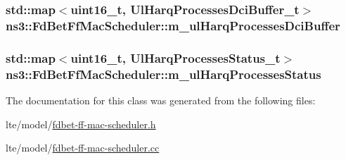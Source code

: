 \subsubsection[{\texorpdfstring{m\+\_\+ul\+Harq\+Processes\+Dci\+Buffer}{m_ulHarqProcessesDciBuffer}}]{\setlength{\rightskip}{0pt plus 5cm}std\+::map$<$uint16\+\_\+t, {\bf Ul\+Harq\+Processes\+Dci\+Buffer\+\_\+t}$>$ ns3\+::\+Fd\+Bet\+Ff\+Mac\+Scheduler\+::m\+\_\+ul\+Harq\+Processes\+Dci\+Buffer\hspace{0.3cm}{\ttfamily [private]}}\hypertarget{classns3_1_1FdBetFfMacScheduler_a9b0359136a7f50a8baf80b3b17367869}{}\label{classns3_1_1FdBetFfMacScheduler_a9b0359136a7f50a8baf80b3b17367869}
\subsubsection[{\texorpdfstring{m\+\_\+ul\+Harq\+Processes\+Status}{m_ulHarqProcessesStatus}}]{\setlength{\rightskip}{0pt plus 5cm}std\+::map$<$uint16\+\_\+t, {\bf Ul\+Harq\+Processes\+Status\+\_\+t}$>$ ns3\+::\+Fd\+Bet\+Ff\+Mac\+Scheduler\+::m\+\_\+ul\+Harq\+Processes\+Status\hspace{0.3cm}{\ttfamily [private]}}\hypertarget{classns3_1_1FdBetFfMacScheduler_a7abd82b962ddf3b3fb688de9528bc04a}{}\label{classns3_1_1FdBetFfMacScheduler_a7abd82b962ddf3b3fb688de9528bc04a}


The documentation for this class was generated from the following files\+:\begin{DoxyCompactItemize}
\item 
lte/model/\hyperlink{fdbet-ff-mac-scheduler_8h}{fdbet-\/ff-\/mac-\/scheduler.\+h}\item 
lte/model/\hyperlink{fdbet-ff-mac-scheduler_8cc}{fdbet-\/ff-\/mac-\/scheduler.\+cc}\end{DoxyCompactItemize}
